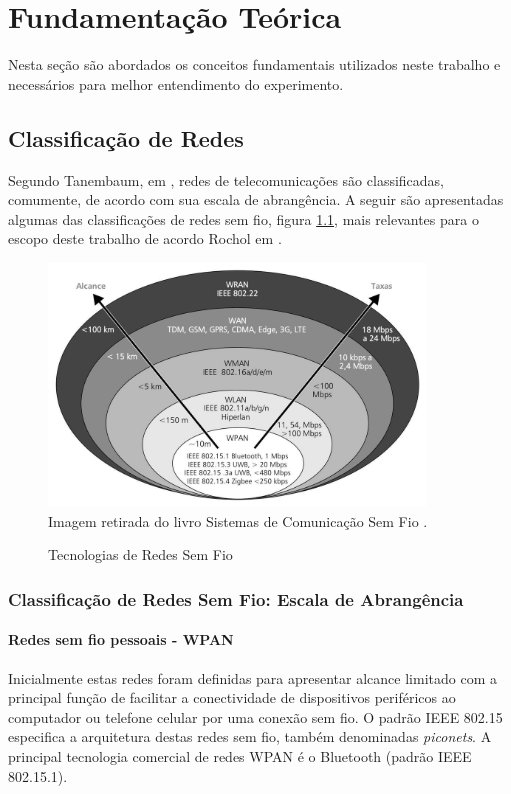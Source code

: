 \chapter{Fundamentação Teórica}
\label{fundamentacao}
Nesta seção são abordados os conceitos fundamentais utilizados neste trabalho e necessários para melhor entendimento do experimento.

\section{Classificação de Redes}
\label{classRedes}
Segundo Tanembaum, em \cite{tanembaum2011}, redes de telecomunicações são classificadas, comumente, de acordo com sua escala de abrangência. A seguir são apresentadas algumas das classificações de redes sem fio, figura \ref{fig:tecnologias_redes_semfiof}, mais relevantes para o escopo deste trabalho de acordo Rochol em \cite{rochol2018sistemas}.

\begin{figure}[ht]
      \begin{center}
          \caption{Tecnologias de Redes Sem Fio}
          \includegraphics[width=10cm]{./sections/textual/chapters/images/tecnologias_redes_semfio.png}\\
          Imagem retirada do livro Sistemas de Comunicação Sem Fio \cite{rochol2018sistemas}.
          \label{fig:tecnologias_redes_semfiof}
      \end{center}
  \end{figure}

\subsection{Classificação de Redes Sem Fio: Escala de Abrangência}
\subsubsection*{Redes sem fio pessoais - WPAN}
Inicialmente estas redes foram definidas para apresentar alcance limitado com a principal função de facilitar a conectividade de dispositivos periféricos ao computador ou telefone celular por uma conexão sem fio. O padrão IEEE 802.15 especifica a arquitetura destas redes sem fio, também denominadas \emph{piconets}. A principal  tecnologia comercial de redes WPAN é o Bluetooth (padrão IEEE 802.15.1).

